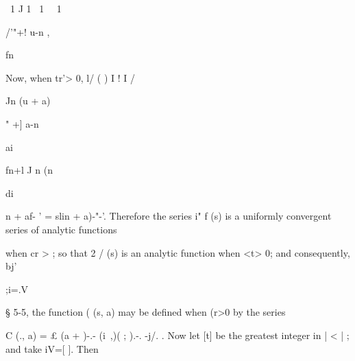 \  1 J 1 \  1 \ \  1 

/'"+! u-n , 

fn 

Now, when tr'> 0, l/  ( ) I   !   I / 

Jn (u + a) 



" +] a-n 

ai 



fn+l 
J n (n   



di 



 n + af- ' 
=  slin + a)-"-'. 
Therefore the series i" f  (s) is a uniformly convergent series of analytic functions 

when cr > ; so that 2 /  (s) is an analytic function when <t> 0; and consequently, bj' 

;i=.V 

§ 5-5, the function ( (s, a) may be defined when (r>0 by the series 

C (., a) = £ (a +  )-.- (i\ ,)( ;  ).-. -j/.  . 
Now let [t] be the greatest integer in | < | ; and take iV=[ ]. Then 

